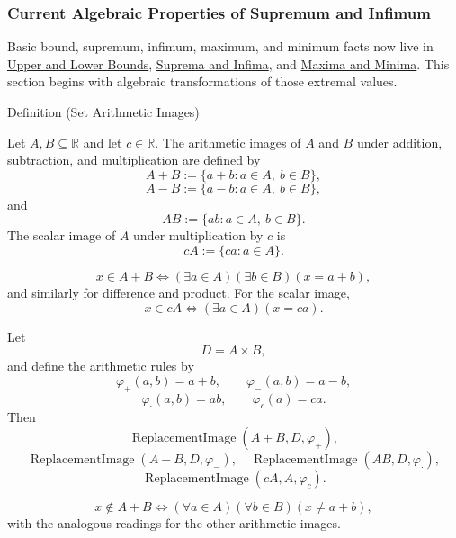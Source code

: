 \subsubsection*{Current Algebraic Properties of Supremum and Infimum}

\begin{remark*}
Basic bound, supremum, infimum, maximum, and minimum facts now live in
\hyperref[def:real-upper-bound]{Upper and Lower Bounds},
\hyperref[def:supremum]{Suprema and Infima}, and
\hyperref[def:maximum]{Maxima and Minima}.  This section begins with
algebraic transformations of those extremal values.
\end{remark*}

\begin{definitionbox}{Definition (Set Arithmetic Images)}
\begin{definition}
\label{def:set-arithmetic-images}
Let $A,B\subseteq\mathbb{R}$ and let $c\in\mathbb{R}$.  The arithmetic
images of $A$ and $B$ under addition, subtraction, and multiplication are
defined by
\[
  A+B:=\{a+b:a\in A,\ b\in B\},
\]
\[
  A-B:=\{a-b:a\in A,\ b\in B\},
\]
and
\[
  AB:=\{ab:a\in A,\ b\in B\}.
\]
The scalar image of $A$ under multiplication by $c$ is
\[
  cA:=\{ca:a\in A\}.
\]
\end{definition}
\end{definitionbox}

\begin{remark*}
\[
x\in A+B\Longleftrightarrow(\exists a\in A)(\exists b\in B)(x=a+b),
\]
and similarly for difference and product.  For the scalar image,
\[
x\in cA\Longleftrightarrow(\exists a\in A)(x=ca).
\]
\end{remark*}

\begin{remark*}
Let
\[
D=A\times B,
\]
and define the arithmetic rules by
\[
\varphi_{+}(a,b)=a+b,\qquad
\varphi_{-}(a,b)=a-b,
\]
\[
\varphi_{\cdot}(a,b)=ab,\qquad
\varphi_c(a)=ca.
\]
Then
\[
\operatorname{ReplacementImage}(A+B,D,\varphi_{+}),
\]
\[
\operatorname{ReplacementImage}(A-B,D,\varphi_{-}),
\quad
\operatorname{ReplacementImage}(AB,D,\varphi_{\cdot}),
\]
\[
\operatorname{ReplacementImage}(cA,A,\varphi_c).
\]
\end{remark*}

\begin{remark*}
\[
x\notin A+B\Longleftrightarrow(\forall a\in A)(\forall b\in B)(x\neq a+b),
\]
with the analogous readings for the other arithmetic images.
\end{remark*}


